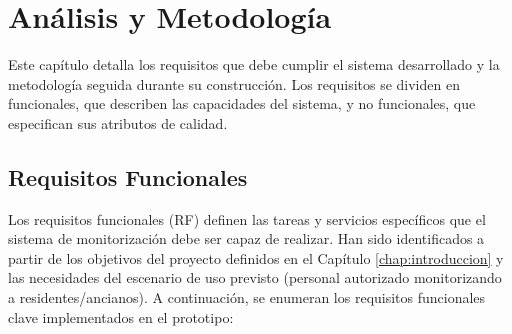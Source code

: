 \chapter{Análisis y Metodología}
\label{chap:requisitos_metodologia}

Este capítulo detalla los requisitos que debe cumplir el sistema desarrollado y la metodología seguida durante su construcción. Los requisitos se dividen en funcionales, que describen las capacidades del sistema, y no funcionales, que especifican sus atributos de calidad.

\section{Requisitos Funcionales}
\label{sec:requisitos_funcionales}

Los requisitos funcionales (RF) definen las tareas y servicios específicos que el sistema de monitorización debe ser capaz de realizar. Han sido identificados a partir de los objetivos del proyecto definidos en el Capítulo \ref{chap:introduccion} y las necesidades del escenario de uso previsto (personal autorizado monitorizando a residentes/ancianos). A continuación, se enumeran los requisitos funcionales clave implementados en el prototipo:

